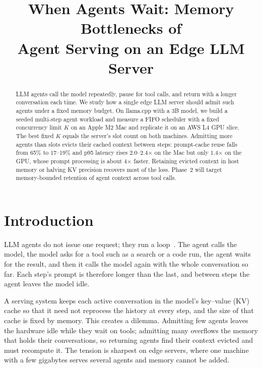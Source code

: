 \documentclass[conference,letterpaper]{IEEEtran}
\begin{document}
\title{When Agents Wait: Memory Bottlenecks of\\Agent Serving on an Edge LLM Server}

\author{
}

\maketitle

\begin{abstract}
LLM agents call the model repeatedly, pause for tool calls, and return with a longer conversation each time. We study how a single edge LLM server should admit such agents under a fixed memory budget. On llama.cpp with a 3B model, we build a seeded multi-step agent workload and measure a FIFO scheduler with a fixed concurrency limit $K$ on an Apple M2 Mac and replicate it on an AWS L4 GPU slice. The best fixed $K$ equals the server's slot count on both machines. Admitting more agents than slots evicts their cached context between steps: prompt-cache reuse falls from 65\% to 17--19\% and p95 latency rises 2.0--2.4$\times$ on the Mac but only 1.4$\times$ on the GPU, whose prompt processing is about 4$\times$ faster. Retaining evicted context in host memory or halving KV precision recovers most of the loss. Phase~2 will target memory-bounded retention of agent context across tool calls.
\end{abstract}

\section{Introduction}
LLM agents do not issue one request; they run a loop~\cite{yao2023react}. The agent calls the model, the model asks for a tool such as a search or a code run, the agent waits for the result, and then it calls the model again with the whole conversation so far. Each step's prompt is therefore longer than the last, and between steps the agent leaves the model idle.

A serving system keeps each active conversation in the model's key--value (KV) cache so that it need not reprocess the history at every step, and the size of that cache is fixed by memory. This creates a dilemma. Admitting few agents leaves the hardware idle while they wait on tools; admitting many overflows the memory that holds their conversations, so returning agents find their context evicted and must recompute it. The tension is sharpest on edge servers, where one machine with a few gigabytes serves several agents and memory cannot be added.
\end{document}
